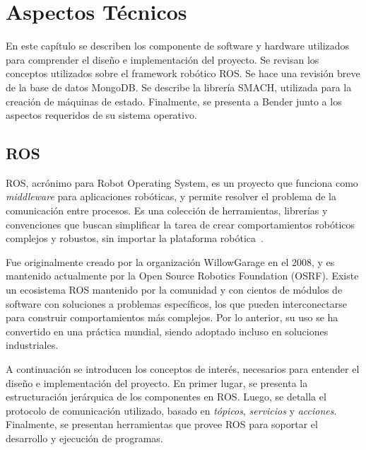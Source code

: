 \chapter{Aspectos Técnicos}\label{chapter:technical}

En este capítulo se describen los componente de software y hardware utilizados para comprender el diseño e implementación del proyecto. Se revisan los conceptos utilizados sobre el framework robótico ROS. Se hace una revisión breve de la base de datos MongoDB. Se describe la librería SMACH, utilizada para la creación de máquinas de estado. Finalmente, se presenta a Bender junto a los aspectos requeridos de su sistema operativo.

\section{ROS}

ROS, acrónimo para Robot Operating System, es un proyecto que funciona como \textit{middleware} para aplicaciones robóticas, y permite resolver el problema de la comunicación entre procesos. Es una colección de herramientas, librerías y convenciones que buscan simplificar la tarea de crear comportamientos robóticos complejos y robustos, sin importar la plataforma robótica~\cite{ROS:2009}.

Fue originalmente creado por la organización WillowGarage en el 2008, y es mantenido actualmente por la Open Source Robotics Foundation (OSRF). Existe un ecosistema ROS mantenido por la comunidad y con cientos de módulos de software con soluciones a problemas específicos, los que pueden interconectarse para construir comportamientos más complejos. Por lo anterior, su uso se ha convertido en una práctica mundial, siendo adoptado incluso en soluciones industriales.

A continuación se introducen los conceptos de interés, necesarios para entender el diseño e implementación del proyecto. En primer lugar, se presenta la estructuración jerárquica de los componentes en ROS. Luego, se detalla el protocolo de comunicación utilizado, basado en \textit{tópicos}, \textit{servicios} y \textit{acciones}. Finalmente, se presentan herramientas que provee ROS para soportar el desarrollo y ejecución de programas.

